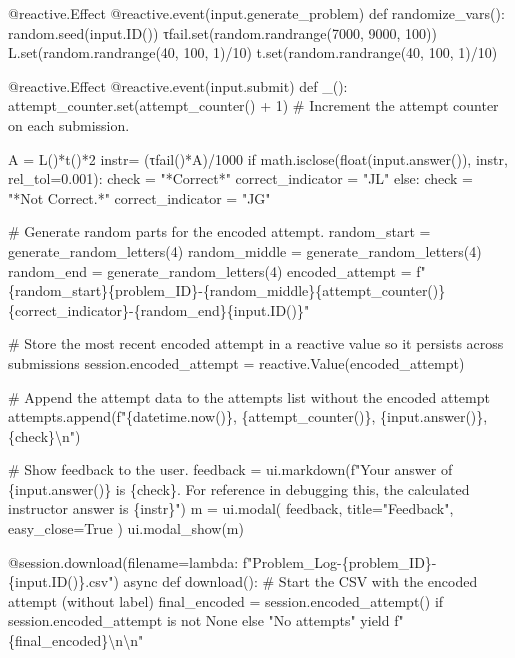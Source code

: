 \documentclass[
  letterpaper,
  DIV=11,
  numbers=noendperiod]{scrreprt}
\newenvironment{Shaded}{\begin{snugshade}}{\end{snugshade}}
\newcommand{\NormalTok}[1]{\textcolor[rgb]{0.00,0.23,0.31}{#1}}
\begin{document}
\begin{Shaded}
\begin{Highlighting}[]
\NormalTok{    @reactive.Effect}
\NormalTok{    @reactive.event(input.generate\_problem)}
\NormalTok{    def randomize\_vars():}
\NormalTok{        random.seed(input.ID())}
\NormalTok{        τfail.set(random.randrange(7000, 9000, 100))}
\NormalTok{        L.set(random.randrange(40, 100, 1)/10)}
\NormalTok{        t.set(random.randrange(40, 100, 1)/10)}
        

\NormalTok{    @reactive.Effect}
\NormalTok{    @reactive.event(input.submit)}
\NormalTok{    def \_():}
\NormalTok{        attempt\_counter.set(attempt\_counter() + 1)  \# Increment the attempt counter on each submission.}
    
\NormalTok{        A = L()*t()*2}
\NormalTok{        instr= (τfail()*A)/1000}
\NormalTok{        if math.isclose(float(input.answer()), instr, rel\_tol=0.001):}
\NormalTok{            check = "*Correct*"}
\NormalTok{            correct\_indicator = "JL"}
\NormalTok{        else:}
\NormalTok{            check = "*Not Correct.*"}
\NormalTok{            correct\_indicator = "JG"}

\NormalTok{        \# Generate random parts for the encoded attempt.}
\NormalTok{        random\_start = generate\_random\_letters(4)}
\NormalTok{        random\_middle = generate\_random\_letters(4)}
\NormalTok{        random\_end = generate\_random\_letters(4)}
\NormalTok{        encoded\_attempt = f"\{random\_start\}\{problem\_ID\}{-}\{random\_middle\}\{attempt\_counter()\}\{correct\_indicator\}{-}\{random\_end\}\{input.ID()\}"}

\NormalTok{        \# Store the most recent encoded attempt in a reactive value so it persists across submissions}
\NormalTok{        session.encoded\_attempt = reactive.Value(encoded\_attempt)}

\NormalTok{        \# Append the attempt data to the attempts list without the encoded attempt}
\NormalTok{        attempts.append(f"\{datetime.now()\}, \{attempt\_counter()\}, \{input.answer()\}, \{check\}\textbackslash{}n")}

\NormalTok{        \# Show feedback to the user.}
\NormalTok{        feedback = ui.markdown(f"Your answer of \{input.answer()\} is \{check\}. For reference in debugging this, the calculated instructor answer is \{instr\}")}
\NormalTok{        m = ui.modal(}
\NormalTok{            feedback,}
\NormalTok{            title="Feedback",}
\NormalTok{            easy\_close=True}
\NormalTok{        )}
\NormalTok{        ui.modal\_show(m)}

\NormalTok{    @session.download(filename=lambda: f"Problem\_Log{-}\{problem\_ID\}{-}\{input.ID()\}.csv")}
\NormalTok{    async def download():}
\NormalTok{        \# Start the CSV with the encoded attempt (without label)}
\NormalTok{        final\_encoded = session.encoded\_attempt() if session.encoded\_attempt is not None else "No attempts"}
\NormalTok{        yield f"\{final\_encoded\}\textbackslash{}n\textbackslash{}n"}
        

\end{Highlighting}
\end{Shaded}
\end{document}

